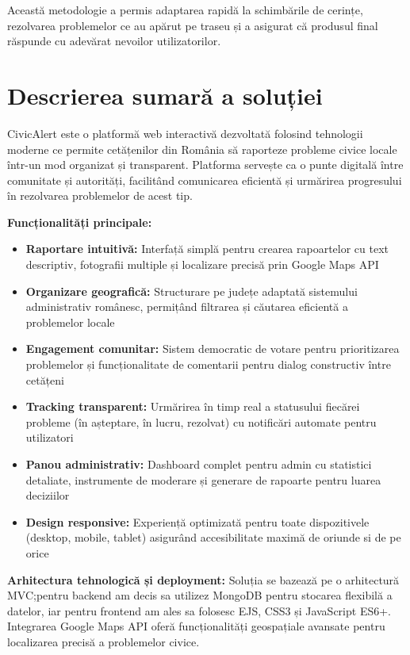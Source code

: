 \documentclass[12pt,a4paper]{report}
\begin{document}
Această metodologie a permis adaptarea rapidă la schimbările de cerințe, rezolvarea problemelor ce au apărut pe traseu și a asigurat că produsul final răspunde cu adevărat nevoilor utilizatorilor.

\section*{Descrierea sumară a soluției}

CivicAlert este o platformă web interactivă dezvoltată folosind tehnologii moderne  ce permite cetățenilor din România să raporteze probleme civice locale într-un mod organizat și transparent. Platforma servește ca o punte digitală între comunitate și autorități, facilitând comunicarea eficientă și urmărirea progresului în rezolvarea problemelor de acest tip.

\textbf{Funcționalități principale:}
\begin{itemize}
\item \textbf{Raportare intuitivă:} Interfață simplă pentru crearea rapoartelor cu text descriptiv, fotografii multiple și localizare precisă prin Google Maps API
\item \textbf{Organizare geografică:} Structurare pe județe adaptată sistemului administrativ românesc, permițând filtrarea și căutarea eficientă a problemelor locale
\item \textbf{Engagement comunitar:} Sistem democratic de votare pentru prioritizarea problemelor și funcționalitate de comentarii pentru dialog constructiv între cetățeni
\item \textbf{Tracking transparent:} Urmărirea în timp real a statusului fiecărei probleme (în așteptare, în lucru, rezolvat) cu notificări automate pentru utilizatori
\item \textbf{Panou administrativ:} Dashboard complet pentru admin cu statistici detaliate, instrumente de moderare și generare de rapoarte pentru luarea deciziilor
\item \textbf{Design responsive:} Experiență optimizată pentru toate dispozitivele (desktop, mobile, tablet) asigurând accesibilitate maximă de oriunde si de pe orice
\end{itemize}

\textbf{Arhitectura tehnologică și deployment:}
Soluția se bazează pe o arhitectură MVC;pentru backend am decis sa utilizez MongoDB pentru stocarea flexibilă a datelor, iar pentru frontend am ales sa folosesc  EJS, CSS3 și JavaScript ES6+. Integrarea Google Maps API oferă funcționalități geospațiale avansate pentru localizarea precisă a problemelor civice.
\end{document}
